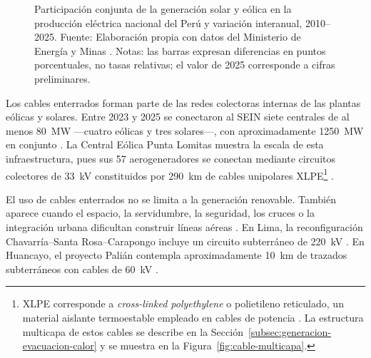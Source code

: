 \documentclass[11pt,a4paper,oneside]{report}
\begin{document}
\begin{figure}[htbp]
\caption[Participación de la generación solar y eólica en el Perú]{Participación conjunta de la generación solar y eólica en la producción eléctrica nacional del Perú y variación interanual, 2010--2025. Fuente: Elaboración propia con datos del Ministerio de Energía y Minas \parencites[sec.~10.4]{minem2025anuario2024}[cuadro~4]{minem2025indicadoresDiciembre}. Notas: las barras expresan diferencias en puntos porcentuales, no tasas relativas; el valor de 2025 corresponde a cifras preliminares.}
\label{fig:participacion-renovable-peru}
\end{figure}

Los cables enterrados forman parte de las redes colectoras internas de las plantas eólicas y solares. Entre 2023 y 2025 se conectaron al SEIN siete centrales de al menos \SI{80}{\mega\watt} ---cuatro eólicas y tres solares---, con aproximadamente \SI{1250}{\mega\watt} en conjunto \parencites{osinergmin2024puntaLomitas}{minem2024nuevasRER}{minem2025nuevasCentrales}. La Central Eólica Punta Lomitas muestra la escala de esta infraestructura, pues sus 57 aerogeneradores se conectan mediante circuitos colectores de \SI{33}{\kilo\volt} constituidos por \SI{290}{\kilo\metre} de cables unipolares XLPE\footnote{XLPE corresponde a \textit{cross-linked polyethylene} o polietileno reticulado, un material aislante termoestable empleado en cables de potencia \parencites[9--10]{thue1999electrical}{iec60502_2_2014}. La estructura multicapa de estos cables se describe en la Sección~\ref{subsec:generacion-evacuacion-calor} y se muestra en la Figura~\ref{fig:cable-multicapa}.} \parencite{coes2021puntaLomitasEO}.

El uso de cables enterrados no se limita a la generación renovable. También aparece cuando el espacio, la servidumbre, la seguridad, los cruces o la integración urbana dificultan construir líneas aéreas \parencite{cigre2023overheadLines}. En Lima, la reconfiguración Chavarría--Santa Rosa--Carapongo incluye un circuito subterráneo de \SI{220}{\kilo\volt} \parencite[13]{coes2022planTransmision2023_2032}. En Huancayo, el proyecto Palián contempla aproximadamente \SI{10}{\kilo\metre} de trazados subterráneos con cables de \SI{60}{\kilo\volt} \parencites[168]{coes2022planTransmision2023_2032}[3,55--56]{proinversion2026palian}.
\end{document}
